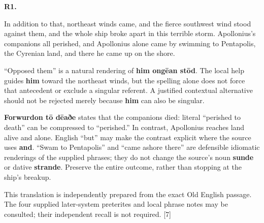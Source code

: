 \par\begin{minipage}{\linewidth}\raggedright
\textbf{R1.}

In addition to that, northeast winds came, and the fierce southwest wind stood against them, and the whole ship broke apart in this terrible storm. Apollonius's companions all perished, and Apollonius alone came by swimming to Pentapolis, the Cyrenian land, and there he came up on the shore.

“Opposed them” is a natural rendering of \textbf{him ongēan stōd}. The local help guides \textbf{him} toward the northeast winds, but the spelling alone does not force that antecedent or exclude a singular referent. A justified contextual alternative should not be rejected merely because \textbf{him} can also be singular.

\textbf{Forwurdon tō dēaðe} states that the companions died: literal “perished to death” can be compressed to “perished.” In contrast, Apollonius reaches land alive and alone. English “but” may make the contrast explicit where the source uses \textbf{and}. “Swam to Pentapolis” and “came ashore there” are defensible idiomatic renderings of the supplied phrases; they do not change the source's noun \textbf{sunde} or dative \textbf{strande}. Preserve the entire outcome, rather than stopping at the ship's breakup.

This translation is independently prepared from the exact Old English passage. The four supplied later-system preterites and local phrase notes may be consulted; their independent recall is not required. [7]

\end{minipage}\par\addvspace{4pt}

